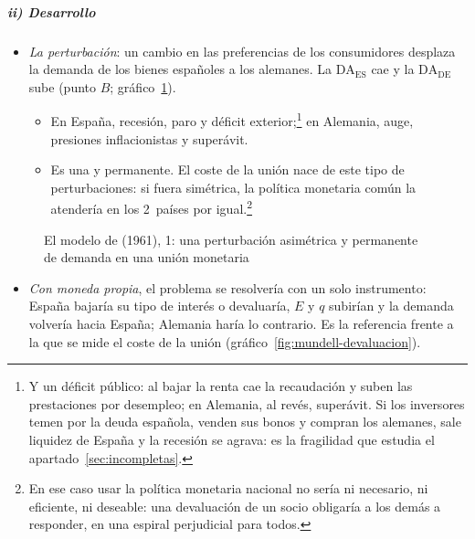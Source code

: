 \documentclass[11pt]{article}
\begin{document}
\subparagraph{ii) Desarrollo}

\begin{itemize}
\item \emph{La perturbación}: un cambio en las preferencias de los consumidores desplaza la demanda de los bienes españoles a los alemanes. La $\mathrm{DA}_{\mathrm{ES}}$ cae y la $\mathrm{DA}_{\mathrm{DE}}$ sube (punto $B$; gráfico~\ref{fig:mundell-perturbacion}).
  \begin{itemize}
  \item En España, recesión, paro y déficit exterior;\footnote{Y un déficit público: al bajar la renta cae la recaudación y suben las prestaciones por desempleo; en Alemania, al revés, superávit. Si los inversores temen por la deuda española, venden sus bonos y compran los alemanes, sale liquidez de España y la recesión se agrava: es la fragilidad que estudia el apartado~\ref{sec:incompletas}.} en Alemania, auge, presiones inflacionistas y superávit.
  \item Es una  y permanente. El coste de la unión nace de este tipo de perturbaciones: si fuera simétrica, la política monetaria común la atendería en los 2~países por igual.\footnote{En ese caso usar la política monetaria nacional no sería ni necesario, ni eficiente, ni deseable: una devaluación de un socio obligaría a los demás a responder, en una espiral perjudicial para todos.}
  \end{itemize}
\end{itemize}

\begin{figure}[H]
\centering
\caption{El modelo de  (1961), 1: una perturbación asimétrica y permanente de demanda en una unión monetaria}\label{fig:mundell-perturbacion}
\end{figure}

\begin{itemize}
\item \emph{Con moneda propia}, el problema se resolvería con un solo instrumento: España bajaría su tipo de interés o devaluaría, $E$ y $q$ subirían y la demanda volvería hacia España; Alemania haría lo contrario. Es la referencia frente a la que se mide el coste de la unión (gráfico~\ref{fig:mundell-devaluacion}).
\end{itemize}
\end{document}
